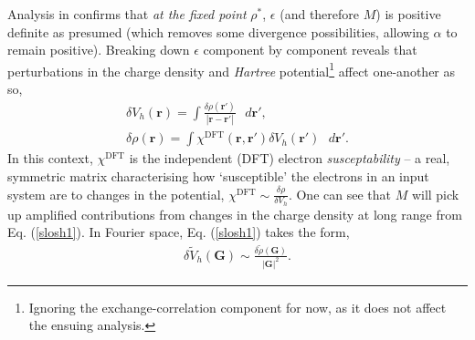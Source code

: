 Analysis in \citep{Fderiv2} confirms that \textit{at the fixed point} $\rho^*$, $\epsilon$ (and therefore $M$) is positive definite as presumed (which removes some divergence possibilities, allowing $\alpha$ to remain positive). Breaking down $\epsilon$ component by component reveals that perturbations in the charge density and \textit{Hartree} potential\footnote{Ignoring the exchange-correlation component for now, as it does not affect the ensuing analysis.} affect one-another as so,
\begin{gather}
\delta V_h(\textbf{r}) = \int \frac{\delta \rho(\textbf{r}')}{|\textbf{r} - \textbf{r}'|} \text{ } d\textbf{r}', \label{slosh1} \\
\delta \rho(\textbf{r}) = \int \chi^{\text{DFT}} (\textbf{r},\textbf{r}') \delta V_h(\textbf{r}') \text{ } d\textbf{r}'. \label{slosh2}
\end{gather}
In this context, $\chi^{\text{DFT}}$ is the independent (DFT) electron \textit{susceptability} -- a real, symmetric matrix characterising how `susceptible' the electrons in an input system are to changes in the potential, $\chi^{\text{DFT}} \sim \frac{\delta \rho}{\delta V_h}$. One can see that $M$ will pick up amplified contributions from changes in the charge density at long range from Eq$.$ (\ref{slosh1}). In Fourier space, Eq$.$ (\ref{slosh1}) takes the form,
\begin{gather}
\delta \tilde{V}_h(\textbf{G}) \sim \frac{\delta \tilde{\rho}(\textbf{G})}{|\textbf{G}|^2}.
\end{gather}
